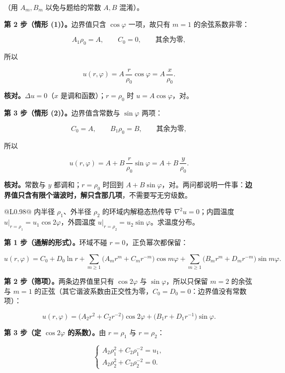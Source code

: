 \documentclass[11pt]{ctexart}
\renewcommand{\thead}[1]{\leavevmode{\bfseries\color{violetdeep}#1}}
\let\origsubhdr\subhdr
\renewcommand{\subhdr}[1]{\par\needspace{3\baselineskip}\origsubhdr{#1}}
\begin{document}
（用 $A_m,B_m$ 以免与题给的常数 $A,B$ 混淆）。

\textbf{第 2 步（情形 (1)）。}边界值只含 $\cos\varphi$ 一项，故只有 $m=1$ 的余弦系数非零：

\[
A_1\rho_0=A,\qquad C_0=0,\qquad \text{其余为零},
\]

所以

\[
u(r,\varphi)=A\,\frac{r}{\rho_0}\cos\varphi=A\,\frac{x}{\rho_0}.
\]

\textbf{核对。}$\Delta u=0$（$x$ 是调和函数）；$r=\rho_0$ 时 $u=A\cos\varphi$，对。

\textbf{第 3 步（情形 (2)）。}边界值含常数与 $\sin\varphi$ 两项：

\[
C_0=A,\qquad B_1\rho_0=B,\qquad \text{其余为零},
\]

所以

\[
u(r,\varphi)=A+B\,\frac{r}{\rho_0}\sin\varphi=A+B\,\frac{y}{\rho_0}.
\]

\textbf{核对。}常数与 $y$ 都调和；$r=\rho_0$ 时回到 $A+B\sin\varphi$，对。两问都说明一件事：\textbf{边界值只含有限个谐波时，解只含那几项}，不需要写无穷级数。


\begin{center}
\tabtop
\begin{tabular}{@{}L{0.98\linewidth}@{}}
\thead{课件 p6 作业 7}\quad 内半径 $\rho_1$、外半径 $\rho_2$ 的环域内解稳态热传导 $\nabla^2u=0$；内圆温度 $u\big|_{r=\rho_1}=u_1\cos2\varphi$，外圆温度 $u\big|_{r=\rho_2}=u_2\sin\varphi$。求温度分布。 \\
\end{tabular}
\tabbot
\end{center}

\textbf{第 1 步（通解的形式）。}环域不碰 $r=0$，正负幂次都保留：

\[
u(r,\varphi)=C_0+D_0\ln r+\sum_{m\ge1}\big(A_mr^m+C_mr^{-m}\big)\cos m\varphi+\sum_{m\ge1}\big(B_mr^m+D_mr^{-m}\big)\sin m\varphi .
\]

\textbf{第 2 步（筛项）。}两条边界值里只有 $\cos2\varphi$ 与 $\sin\varphi$，所以只保留 $m=2$ 的余弦与 $m=1$ 的正弦（其它谐波系数由正交性为零，$C_0=D_0=0$：边界值没有常数项）：

\[
u(r,\varphi)=\big(A_2r^2+C_2r^{-2}\big)\cos2\varphi+\big(B_1r+D_1r^{-1}\big)\sin\varphi .
\]

\textbf{第 3 步（定 $\cos2\varphi$ 的系数）。}由 $r=\rho_1$ 与 $r=\rho_2$：

\[
\begin{cases}
A_2\rho_1^2+C_2\rho_1^{-2}=u_1,\\[2pt]
A_2\rho_2^2+C_2\rho_2^{-2}=0 .
\end{cases}
\]
\end{document}
